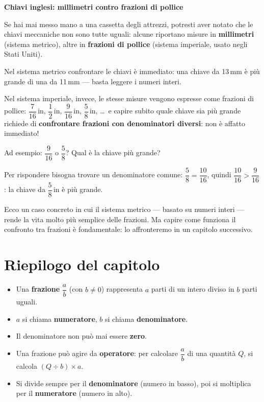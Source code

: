\begin{sapevi}
    \textbf{Chiavi inglesi: millimetri contro frazioni di pollice}

    Se hai mai messo mano a una cassetta degli attrezzi, potresti aver notato
    che le chiavi meccaniche non sono tutte uguali: alcune riportano misure
    in \textbf{millimetri} (sistema metrico), altre in \textbf{frazioni di pollice}
    (sistema imperiale, usato negli Stati Uniti).

    Nel sistema metrico confrontare le chiavi è immediato: una chiave da 13\,mm
    è più grande di una da 11\,mm — basta leggere i numeri interi.

    Nel sistema imperiale, invece, le stesse misure vengono espresse come frazioni
    di pollice: $\dfrac{7}{16}$\,in, $\dfrac{1}{2}$\,in, $\dfrac{9}{16}$\,in,
    $\dfrac{5}{8}$\,in, \ldots\ e capire subito quale chiave sia più grande
    richiede di \textbf{confrontare frazioni con denominatori diversi}:
    non è affatto immediato!

    Ad esempio: $\dfrac{9}{16}$ o $\dfrac{5}{8}$? Qual è la chiave più grande?

    Per rispondere bisogna trovare un denominatore comune: $\dfrac{5}{8} = \dfrac{10}{16}$,
    quindi $\dfrac{10}{16} > \dfrac{9}{16}$: la chiave da $\dfrac{5}{8}$\,in è più grande.

    Ecco un caso concreto in cui il sistema metrico — basato su numeri interi — rende
    la vita molto più semplice delle frazioni. Ma capire come funziona il confronto
    tra frazioni è fondamentale: lo affronteremo in un capitolo successivo.
\end{sapevi}

\section*{Riepilogo del capitolo}

\begin{tcolorbox}[
        enhanced,
        breakable,
        colback  = blu!5,
        colframe = blu,
        title    = {Riepilogo — Le frazioni},
        fonttitle = \bfseries,
        arc      = 4pt,
    ]
    \begin{itemize}[leftmargin=1.5em, itemsep=4pt]
        \item Una \textbf{frazione} $\dfrac{a}{b}$ (con $b \neq 0$) rappresenta
              $a$ parti di un intero diviso in $b$ parti uguali.
        \item $a$ si chiama \textbf{numeratore}, $b$ si chiama \textbf{denominatore}.
        \item Il denominatore non può mai essere \textbf{zero}.
        \item Una frazione può agire da \textbf{operatore}: per calcolare $\dfrac{a}{b}$
              di una quantità $Q$, si calcola $(Q \div b) \times a$.
        \item Si divide sempre per il \textbf{denominatore} (numero in basso),
              poi si moltiplica per il \textbf{numeratore} (numero in alto).
    \end{itemize}
\end{tcolorbox}